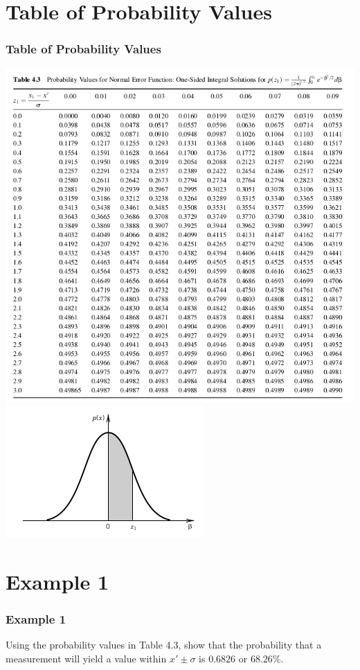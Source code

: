 \documentclass[fleqn]{beamer} %
\newcommand{\sectiontitleI}{Table of Probability Values }
\newcommand{\sectiontitleII}{Example 1}
\begin{document}
\section{\sectiontitleI}	
	\begin{frame}[label=sectionI] \small
		\frametitle{\sectiontitleI}    

		\includegraphics[scale=.3]{topic2_fig2.png}	
		\includegraphics[scale=.3]{topic2_fig3.png}	

	\end{frame}


\section{\sectiontitleII}	
	\begin{frame}[label=sectionII] \small
		\frametitle{\sectiontitleII}    
		
		Using the probability values in Table 4.3, show that the probability that a measurement will yield a
value within $x'\pm \sigma$ is $0.6826$ or $68.26\%$.

		\vspace{30mm}
		


	\end{frame}
	
\end{document}
